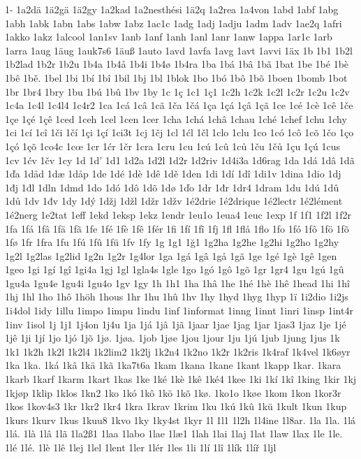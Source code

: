 1-
1a2dä
1ä2gä
1ä2gy
1a2kad
1a2nesthési
1ä2q
1a2rea
1a4von
1abd
1abf
1abg
1abh
1abk
1abn
1abs
1abw
1abz
1ac1c
1adg
1adj
1adju
1adm
1adv
1ae2q
1afri
1akko
1akz
1alcool
1an1sv
1anb
1anf
1anh
1anl
1anr
1anw
1appa
1ar1c
1arb
1arra
1aug
1äug
1auk7s6
1äuß
1auto
1avd
1avfa
1avg
1avt
1avvi
1äx
1b
1b1
1b2l
1b2lad
1b2r
1b2u
1b4a
1b4å
1b4i
1b4ø
1b4ra
1ba
1bá
1bâ
1bã
1bat
1be
1bé
1bè
1bê
1bě.
1bel
1bi
1bí
1bî
1bil
1bj
1bl
1blok
1bo
1bó
1bô
1bõ
1boen
1bomb
1bot
1br
1br4
1bry
1bu
1bú
1bû
1bv
1by
1c
1ç
1c1
1ç1
1c2h
1c2k
1c2l
1c2r
1c2u
1c2v
1c4a
1c4l
1c4l4
1c4r2
1ca
1cá
1câ
1cã
1ča
1čá
1ça
1çá
1çâ
1çã
1ce
1cé
1cè
1cê
1če
1çe
1çé
1çê
1ced
1ceh
1cel
1cen
1cer
1cha
1chá
1châ
1chau
1ché
1chef
1chu
1chy
1ci
1cí
1cî
1či
1čí
1çi
1çí
1ci3t
1cj
1čj
1cl
1ćl
1čl
1clo
1clu
1co
1có
1cô
1cõ
1čo
1ço
1çó
1çõ
1co4c
1cœ
1cr
1ćr
1čr
1cra
1cru
1cu
1cú
1cû
1ců
1ču
1čů
1çu
1çú
1cus
1cv
1ćv
1čv
1cy
1d
1d'
1d1
1d2a
1d2l
1d2r
1d2riv
1d4i3a
1d6rag
1da
1dá
1dâ
1dã
1ďa
1dåd
1dæ
1dåp
1de
1dé
1dè
1dê
1dě
1den
1di
1dí
1dî
1di1v
1dina
1dio
1dj
1đj
1đl
1dln
1dmd
1do
1dó
1dô
1dõ
1dø
1ďo
1dr
1đr
1dr4
1dram
1du
1dú
1dû
1dů
1dv
1đv
1dy
1dý
1džj
1džl
1džr
1džv
1é2drie
1é2drique
1é2lectr
1é2lément
1é2nerg
1e2tat
1eff
1ekd
1eksp
1ekz
1endr
1eu1o
1eua4
1euc
1exp
1f
1f1
1f2l
1f2r
1fa
1fá
1fâ
1fä
1fã
1fe
1fé
1fè
1fê
1fér
1fi
1fí
1fî
1fj
1fl
1flå
1flo
1fo
1fó
1fô
1fö
1fõ
1fø
1fr
1fra
1fu
1fú
1fû
1fü
1fv
1fy
1g
1g1
1ğ1
1g2ha
1g2he
1g2hi
1g2ho
1g2hy
1g2l
1g2las
1g2lid
1g2n
1g2r
1g4lor
1ga
1gá
1gâ
1gå
1gã
1ge
1gé
1gè
1gê
1gen
1geo
1gi
1gí
1gî
1gi4a
1gj
1gl
1gla4s
1gle
1go
1gó
1gô
1gõ
1gr
1gr4
1gu
1gú
1gû
1gu4a
1gu4e
1gu4i
1gu4o
1gv
1gy
1h
1h1
1ha
1hâ
1he
1hé
1hè
1hê
1head
1hi
1hî
1hj
1hl
1ho
1hô
1höh
1hous
1hr
1hu
1hû
1hv
1hy
1hyd
1hyg
1hyp
1ï
1i2dio
1i2js
1i4dol
1idy
1illu
1impo
1impu
1indu
1inf
1informat
1inng
1innt
1inri
1insp
1int4r
1inv
1isol
1j
1j1
1j4on
1j4u
1ja
1já
1jâ
1jã
1jaar
1jae
1jag
1jar
1jas3
1jaz
1je
1jé
1jê
1ji
1jí
1jo
1jó
1jõ
1jø.
1jøa.
1job
1jøe
1jou
1jour
1ju
1jú
1jub
1jung
1jus
1k
1k1
1k2h
1k2l
1k2l4
1k2lim2
1k2lj
1k2n4
1k2no
1k2r
1k2ris
1k4raf
1k4vel
1k6øyr
1ka
1ka.
1ká
1kâ
1kä
1kã
1ka7t6a
1kam
1kana
1kane
1kant
1kapp
1kar.
1kara
1karb
1karf
1karm
1kart
1kas
1ke
1ké
1kè
1kê
1ké4
1kee
1ki
1kí
1kî
1king
1kir
1kj
1kjøp
1klip
1klos
1kn2
1ko
1kó
1kô
1kö
1kõ
1kø.
1ko1o
1køe
1kom
1kon
1kor3r
1kos
1kov4s3
1kr
1kr2
1kr4
1kra
1krav
1krim
1ku
1kú
1kû
1kü
1kult
1kun
1kup
1kurs
1kurv
1kus
1kuu8
1kvo
1ky
1ky4st
1kyr
1l
1l1
1l2h
1l4ine
1l8ar.
1la
1la.
1lá
1lá.
1là
1lâ
1lã
1la2ß1
1laa
1labo
1lae
1læ1
1lah
1lai
1laj
1lat
1law
1lax
1le
1le.
1lé
1lé.
1lè
1lê
1lej
1lel
1lent
1ler
1lér
1les
1li
1lí
1lî
1lík
1líř
1ljl
